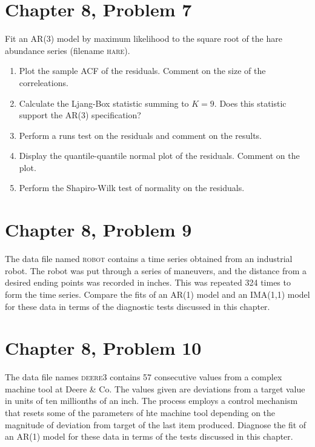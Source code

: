 \documentclass[11pt]{article}
\newif\ifclearpage
\newcommand{\problem}[1]{\section*{#1}}
\newcommand{\solution}{\hrulefill}
\newcommand{\maybeclearpage}{\ifclearpage\clearpage\fi}
\begin{document}
\solution

\maybeclearpage
\problem{Chapter 8, Problem 7}
Fit an AR(3) model by maximum likelihood to the square root of the hare abundance series (filename \textsc{hare}).
\begin{enumerate}
\item Plot the sample ACF of the residuals. Comment on the size of the correleations.
\item Calculate the Ljang-Box statistic summing to $K=9$. Does this statistic support the AR(3) specification?
\item Perform a runs test on the residuals and comment on the results.
\item Display the quantile-quantile normal plot of the residuals. Comment on the plot.
\item Perform the Shapiro-Wilk test of normality on the residuals.
\end{enumerate}

\solution


\maybeclearpage
\problem{Chapter 8, Problem 9}
The data file named \textsc{robot} contains a time series obtained from an industrial robot. The robot was put through a series of maneuvers, and the distance from a desired ending points was recorded in inches. This was repeated 324 times to form the time series. Compare the fits of an AR(1) model and an IMA(1,1) model for these data in terms of the diagnostic tests discussed in this chapter.

\solution


\maybeclearpage
\problem{Chapter 8, Problem 10}
The data file names \textsc{deere3} contains 57 consecutive values from a complex machine tool at Deere \& Co. The values given are deviations from a target value in units of ten millionths of an inch. The process employs a control mechanism that resets some of the parameters of hte machine tool depending on the magnitude of deviation from target of the last item produced. Diagnose the fit of an AR(1) model for these data in terms of the tests discussed in this chapter. 

\solution

\maybeclearpage
\end{document}
